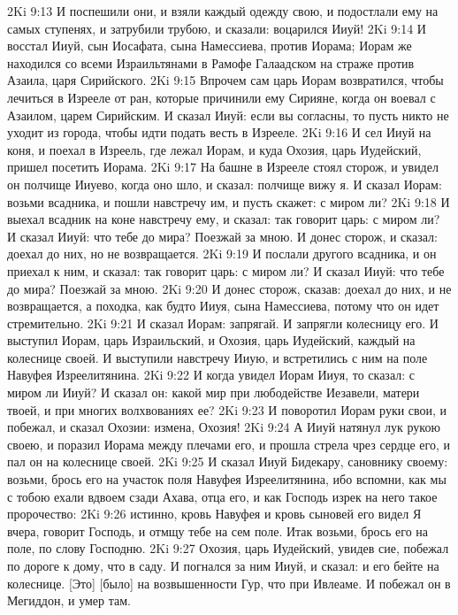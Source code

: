 2Ki 9:13  И поспешили они, и взяли каждый одежду свою, и подостлали ему на самых ступенях, и затрубили трубою, и сказали: воцарился Ииуй!
2Ki 9:14  И восстал Ииуй, сын Иосафата, сына Намессиева, против Иорама; Иорам же находился со всеми Израильтянами в Рамофе Галаадском на страже против Азаила, царя Сирийского.
2Ki 9:15  Впрочем сам царь Иорам возвратился, чтобы лечиться в Изрееле от ран, которые причинили ему Сирияне, когда он воевал с Азаилом, царем Сирийским. И сказал Ииуй: если вы согласны, то пусть никто не уходит из города, чтобы идти подать весть в Изрееле.
2Ki 9:16  И сел Ииуй на коня, и поехал в Изреель, где лежал Иорам, и куда Охозия, царь Иудейский, пришел посетить Иорама.
2Ki 9:17  На башне в Изрееле стоял сторож, и увидел он полчище Ииуево, когда оно шло, и сказал: полчище вижу я. И сказал Иорам: возьми всадника, и пошли навстречу им, и пусть скажет: с миром ли?
2Ki 9:18  И выехал всадник на коне навстречу ему, и сказал: так говорит царь: с миром ли? И сказал Ииуй: что тебе до мира? Поезжай за мною. И донес сторож, и сказал: доехал до них, но не возвращается.
2Ki 9:19  И послали другого всадника, и он приехал к ним, и сказал: так говорит царь: с миром ли? И сказал Ииуй: что тебе до мира? Поезжай за мною.
2Ki 9:20  И донес сторож, сказав: доехал до них, и не возвращается, а походка, как будто Ииуя, сына Намессиева, потому что он идет стремительно.
2Ki 9:21  И сказал Иорам: запрягай. И запрягли колесницу его. И выступил Иорам, царь Израильский, и Охозия, царь Иудейский, каждый на колеснице своей. И выступили навстречу Ииую, и встретились с ним на поле Навуфея Изреелитянина.
2Ki 9:22  И когда увидел Иорам Ииуя, то сказал: с миром ли Ииуй? И сказал он: какой мир при любодействе Иезавели, матери твоей, и при многих волхвованиях ее?
2Ki 9:23  И поворотил Иорам руки свои, и побежал, и сказал Охозии: измена, Охозия!
2Ki 9:24  А Ииуй натянул лук рукою своею, и поразил Иорама между плечами его, и прошла стрела чрез сердце его, и пал он на колеснице своей.
2Ki 9:25  И сказал Ииуй Бидекару, сановнику своему: возьми, брось его на участок поля Навуфея Изреелитянина, ибо вспомни, как мы с тобою ехали вдвоем сзади Ахава, отца его, и как Господь изрек на него такое пророчество:
2Ki 9:26  истинно, кровь Навуфея и кровь сыновей его видел Я вчера, говорит Господь, и отмщу тебе на сем поле. Итак возьми, брось его на поле, по слову Господню.
2Ki 9:27  Охозия, царь Иудейский, увидев сие, побежал по дороге к дому, что в саду. И погнался за ним Ииуй, и сказал: и его бейте на колеснице. [Это] [было] на возвышенности Гур, что при Ивлеаме. И побежал он в Мегиддон, и умер там.

